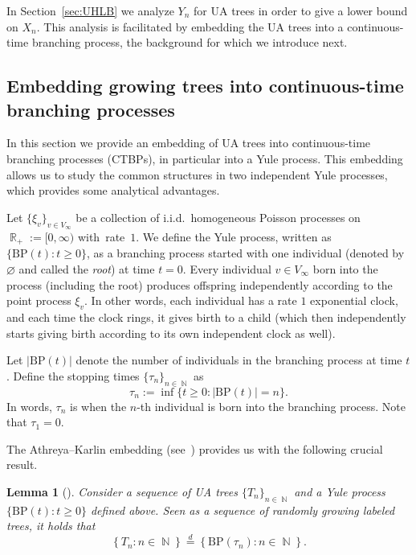 \documentclass[11pt]{article}
\numberwithin{equation}{section}
\DeclareMathOperator{\R}{\mathbb{R}} %
\DeclareMathOperator{\N}{\mathbb{N}} %
\newcommand{\be}{\begin{equation}}
\newcommand{\ee}{\end{equation}}
\newcommand{\bp}{\mathrm{BP}}
\newtheorem{lemma}[theorem]{Lemma}
\theoremstyle{definition}
\begin{document}
In Section~\ref{sec:UHLB} we analyze $Y_{n}$ for UA trees in order to give a lower bound on $X_{n}$. 
This analysis is facilitated by embedding the UA trees into a continuous-time branching process, 
the background for which we introduce next.



\subsection{Embedding growing trees into continuous-time branching processes}\label{sec:embed} 


In this section we provide an embedding of UA trees into continuous-time branching processes (CTBPs), in particular into a Yule process. This embedding allows us to study the common structures in two independent Yule processes, which provides some analytical advantages. 


Let $\{\xi_v\}_{v\in V_\infty}$ be a collection of i.i.d.\ homogeneous Poisson processes on $\R_+:=[0,\infty)$ with~rate~$1$. We define the Yule process, written as $\{\bp(t):t\geq 0\}$, as a branching process started with one individual (denoted by $\varnothing$ and called the \emph{root}) at time $t=0$. Every individual $v\in V_\infty$ born into the process (including the root) produces offspring independently according to the point process $\xi_v$. In other words, each individual has a rate $1$ exponential clock, and each time the clock rings, it gives birth to a child (which then independently starts giving birth according to its own independent clock as well).

Let $|\bp(t)|$ denote the number of individuals in the branching process at time $t$. 
Define the stopping times $\{\tau_{n}\}_{n\in\N}$ 
as 
\be \label{eq:stoppingtimes}
\tau_n:=\inf\{t\geq 0: |\bp(t)|=n\}. 
\ee
In words, $\tau_{n}$ is when the $n$-th individual is born into the branching process. Note that $\tau_{1} = 0$. 

The Athreya--Karlin embedding (see~\cite{AthrKar68}) provides us with the following crucial result. 

\begin{lemma}[\cite{AthrKar68}]\label{thrm:embed}
Consider a sequence of UA trees $\{T_{n}\}_{n\in\N}$ and a Yule process $\{\bp(t): t\geq 0\}$ defined above. 
Seen as a sequence of randomly growing labeled trees, it holds that 
$$\left\{T_n:n\in\N \right\}\overset d=\left\{\bp(\tau_n): n\in\N \right\}.$$  
\end{lemma}
\end{document}
